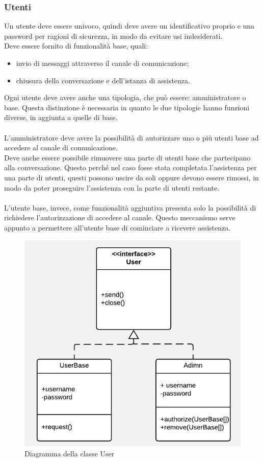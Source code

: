       \subsubsection*{Utenti}
        Un utente deve essere univoco, quindi deve avere un identificativo proprio e una password per ragioni di sicurezza, in modo da evitare usi indesiderati.\\
        Deve essere fornito di funzionalità base, quali:
        \begin{itemize}
          \item invio di messaggi attraverso il canale di comunicazione;
          \item chiusura della conversazione e dell'istanza di assistenza.
        \end{itemize}
        Ogni utente deve avere anche una tipologia, che può essere: amministratore o base. Questa distinzione è necessaria in quanto le due tipologie hanno funzioni diverse, in aggiunta a quelle di base.\\\\
        L'amministratore deve avere la possibilità di autorizzare uno o più utenti base ad accedere al canale di comunicazione.\\
        Deve anche essere possibile rimuovere una parte di utenti base che partecipano alla conversazione. Questo perché nel caso fosse stata completata l'assistenza per una parte di utenti, questi possono uscire da soli oppure devono essere rimossi, in modo da poter proseguire l'assistenza con la parte di utenti restante.\\\\
        L'utente base, invece, come funzionalità aggiuntiva presenta solo la possibilità di richiedere l'autorizzazione di accedere al canale. Questo meccanismo serve appunto a permettere all'utente base di cominciare a ricevere assistenza.
        \begin{figure}[h]
          \centering
          \includegraphics[scale=0.75]{immagini/user.png}
          \caption{Diagramma della classe User}
          \label{user}
        \end{figure}
